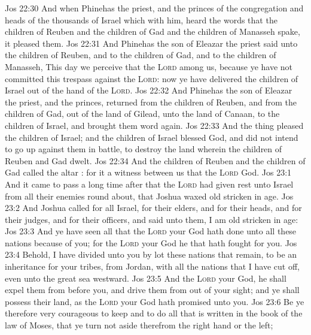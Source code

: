 \vs Jos 22:30 And when Phinehas the priest, and the princes of the congregation and heads of the thousands of Israel which  with him, heard the words that the children of Reuben and the children of Gad and the children of Manasseh spake, it pleased them.
\vs Jos 22:31 And Phinehas the son of Eleazar the priest said unto the children of Reuben, and to the children of Gad, and to the children of Manasseh, This day we perceive that the \textsc{Lord}  among us, because ye have not committed this trespass against the \textsc{Lord}: now ye have delivered the children of Israel out of the hand of the \textsc{Lord}.
\vs Jos 22:32 And Phinehas the son of Eleazar the priest, and the princes, returned from the children of Reuben, and from the children of Gad, out of the land of Gilead, unto the land of Canaan, to the children of Israel, and brought them word again.
\vs Jos 22:33 And the thing pleased the children of Israel; and the children of Israel blessed God, and did not intend to go up against them in battle, to destroy the land wherein the children of Reuben and Gad dwelt.
\vs Jos 22:34 And the children of Reuben and the children of Gad called the altar : for it  a witness between us that the \textsc{Lord}  God.
\vs Jos 23:1 And it came to pass a long time after that the \textsc{Lord} had given rest unto Israel from all their enemies round about, that Joshua waxed old  stricken in age.
\vs Jos 23:2 And Joshua called for all Israel,  for their elders, and for their heads, and for their judges, and for their officers, and said unto them, I am old  stricken in age:
\vs Jos 23:3 And ye have seen all that the \textsc{Lord} your God hath done unto all these nations because of you; for the \textsc{Lord} your God  he that hath fought for you.
\vs Jos 23:4 Behold, I have divided unto you by lot these nations that remain, to be an inheritance for your tribes, from Jordan, with all the nations that I have cut off, even unto the great sea westward.
\vs Jos 23:5 And the \textsc{Lord} your God, he shall expel them from before you, and drive them from out of your sight; and ye shall possess their land, as the \textsc{Lord} your God hath promised unto you.
\vs Jos 23:6 Be ye therefore very courageous to keep and to do all that is written in the book of the law of Moses, that ye turn not aside therefrom  the right hand or  the left;
